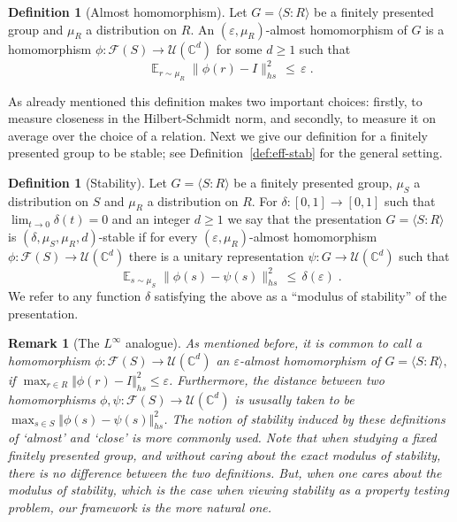 \documentclass[11pt]{article}
\newtheorem{remark}[theorem]{Remark}
\theoremstyle{definition}
\newtheorem{definition}[theorem]{Definition}
\newcommand{\Id}{\ensuremath{I}}
\DeclareMathOperator*{\Expectation}{\mathbb{E}}
\newcommand{\Es}[1]{\Expectation_{#1}}
\newcommand{\C}{\ensuremath{\mathbb{C}}}
\newcommand{\complex}{\ensuremath{\mathbb{C}}}
\newcommand{\mF}{\ensuremath{\mathcal{F}}}
\newcommand{\mU}{\ensuremath{\mathcal{U}}}
\newcommand{\eps}{\varepsilon}
\begin{document}
\begin{definition}[Almost homomorphism]\label{def:approx-hom-intro}
Let $G = \langle S:R\rangle $ be a finitely presented group and $\mu_R$ a distribution on $R$. An $(\eps,\mu_R)$-almost homomorphism of $G$ is a homomorphism $\phi:\mF(S)\to\mU(\C^d)$ for some $d\geq 1$ such that
\[ \Es{r\sim \mu_R} \big\|  \phi(r) - \Id \big \|_{hs}^2 \,\leq\, \eps\;.\]
\end{definition}

As already mentioned this definition makes two important choices: firstly, to measure closeness in the Hilbert-Schmidt norm, and secondly, to measure it on average over the choice of a relation. Next we give our definition for a finitely presented group to be stable; see Definition~\ref{def:eff-stab} for the general setting. 

\begin{definition}[Stability]\label{def:eff-stab-intro}
Let $G = \langle S:R\rangle $ be a finitely presented group, $\mu_S$ a distribution on $S$ and $\mu_R$ a distribution on $R$. For $\delta:[0,1]\to[0,1]$ such that $\lim_{t\to 0}\delta(t)=0$ and an integer $d\geq 1$ we say that the presentation $G=\langle S:R\rangle$ is $(\delta,\mu_S,\mu_R,d)$-stable if for every $(\eps,\mu_R)$-almost homomorphism $\phi: \mF(S) \to \mU(\C^d)$ there is a unitary representation $\psi: G \to \mU(\C^d)$ such that
\[ \Es{s\sim \mu_S} \big\|  \phi(s) - \psi(s) \big \|_{hs}^2 \,\leq\, \delta(\eps)\;.\]
We refer to any function $\delta$ satisfying the above as a ``modulus of stability'' of the presentation.
\end{definition}

\begin{remark}[The $L^\infty$ analogue]\label{rem:L^infty_analogue_defn}
    As mentioned  before, it is common to call a homomorphism $\phi\colon \mF(S)\to \mU(\complex^d)$ an $\eps$-almost homomorphism of $G=\langle S\colon R\rangle,$  if $\max_{r\in R}\Vert \phi(r)-\Id\Vert_{hs}^2\leq \eps$. Furthermore, the distance between two homomorphisms $\phi,\psi\colon \mF(S)\to \mU(\complex^d)$ is ususally taken to be $\max_{s\in S}\Vert \phi(s)-\psi(s)\Vert_{hs}^2$. The notion of stability induced by these definitions of `almost' and `close' is more commonly used. Note that when studying a fixed finitely presented group, and without caring about the exact modulus of stability, there is no difference between the two definitions.  But, when one cares about the modulus of stability, which is the case  when viewing stability as a property testing problem, our framework is the more natural one. 
\end{remark}
\end{document}
